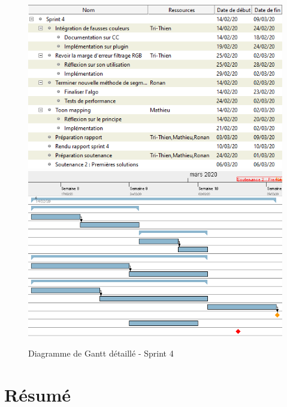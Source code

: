 \documentclass[12pt,titlepage,french]{article}
\begin{document}
\begin{figure}[!hbtp]
  \caption{\label{} Diagramme de Gantt détaillé - Sprint 4}
  \includegraphics[width=1\textwidth]{./img/sprint_iteration_4_tableau.PNG}
  \raisebox{-1\height}
  {\includegraphics[width=1\textwidth]{./img/sprint_iteration_4_diagramme.PNG}} 
\end{figure}

\section{Résumé}
\end{document}
